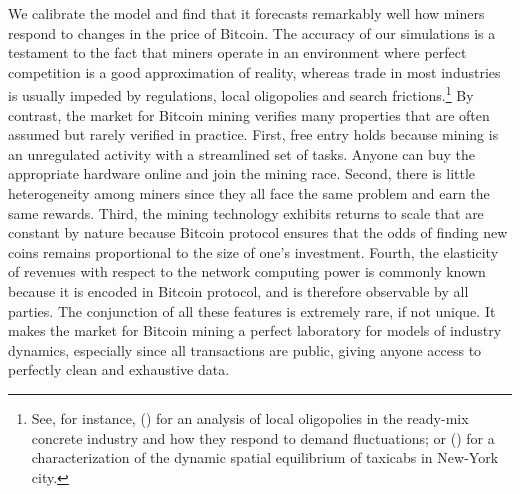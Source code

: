 \documentclass[12pt, a4paper]{article}
\begin{document}
We calibrate the model and find that it forecasts remarkably well how
miners respond to changes in the price of Bitcoin. The accuracy of our
simulations is a testament to the fact that miners operate
in an environment where perfect competition is a good approximation of reality,
whereas trade in most industries is usually impeded by regulations, local oligopolies and search frictions.\footnote{See, for instance, \citeauthor{Collard-Wexler} (\citeyear{Collard-Wexler}) for an analysis
of local oligopolies in the ready-mix concrete industry and how they respond to demand fluctuations;
or \citeauthor{Buchholz} (\citeyear{Buchholz}) for a characterization of the dynamic spatial equilibrium of taxicabs
in New-York city.}
By contrast, the market for Bitcoin mining verifies many properties that are often assumed but rarely verified in
practice. First, free entry holds
because mining is an unregulated
activity with a streamlined set of tasks. Anyone can buy the appropriate hardware online
and join the mining race.
Second, there is little heterogeneity among miners since they all face
the same problem and earn the same rewards. Third, the
mining technology exhibits returns to scale that are constant by nature
because Bitcoin protocol ensures that
the odds of finding new coins remains proportional to the size of one's investment.
Fourth, the elasticity of revenues with respect to the network computing power
is commonly known because it is encoded in Bitcoin protocol, and is
therefore observable by all parties. The conjunction
of all these features is extremely rare, if not unique.
It makes the
market for Bitcoin mining a perfect laboratory for models of industry
dynamics, especially since all transactions are public, giving anyone access
to perfectly clean and exhaustive data.
\end{document}
